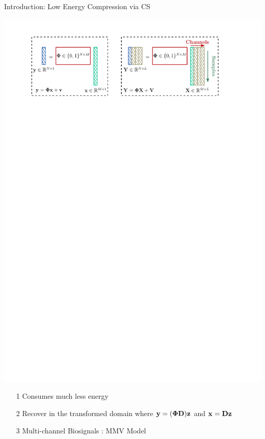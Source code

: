 \documentclass[notheorems,table]{beamer}
\begin{document}
\begin{frame}{Introduction: Low Energy Compression via CS}
    
    {\centering\includegraphics[width=\linewidth]{compress_via_cs.pdf}}
    \begin{itemize}
        \item[1] Consumes much less energy
        \item[2] Recover in the transformed domain where $\mathbf{y}=(\bm{\Phi}\mathbf{D})\mathbf{z}$ and $\mathbf{x}=\mathbf{D}\mathbf{z}$
        \item[3] Multi-channel Biosignals : MMV Model
    \end{itemize}
\end{frame}
\end{document}

